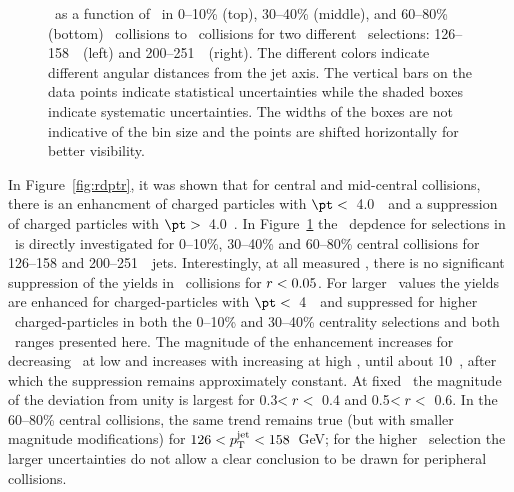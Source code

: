 \begin{figure}
   \caption{\RDptr\ as a function of \pt\ in  0--10\% (top), 30--40\% (middle), and 60--80\% (bottom) \PbPb\ collisions to \pp\ collisions for two different \ptjet\ selections: 126--158~\GeV\ (left) and 200--251~\GeV\ (right). The different colors indicate different angular distances from the jet axis. The vertical bars on the data points indicate statistical uncertainties while the shaded boxes indicate systematic uncertainties. The widths of the boxes are not indicative of the bin size and the points are shifted horizontally for better visibility.}
      \label{fig:pttrkdep}
\end{figure}


In Figure~\ref{fig:rdptr}, it was shown that for central and mid-central collisions, there is an enhancment of
charged particles with $\pt <$~4.0~\GeV\ and a suppression of charged particles with $\pt >$~4.0~\GeV.  In
Figure~\ref{fig:pttrkdep} 
the \pt\ depdence for selections in \rvar\ is directly investigated for 0--10\%, 30--40\% and 60--80\% central 
collisions for 126--158 and 200--251~\GeV\ jets.
Interestingly, at all measured \pt, there is no significant suppression of the yields in \pbpb\ collisions
for $\mbox{$r$} < 0.05$.  For larger \rvar\ values the yields are enhanced for charged-particles with $\pt <$~4~\GeV\ and 
suppressed for higher \pt\ charged-particles in both the 0--10\% and 30--40\% centrality selections and both \ptjet\ 
ranges presented here.  The magnitude of the enhancement increases for decreasing \pt\ at low \pt and increases
with increasing \pt at high \pt, until about 10~\GeV, after which the suppression remains approximately constant.
At fixed \pt\ the magnitude of the deviation from unity is largest for 0.3$< \mbox{$r$} <$~0.4 and 0.5$< \mbox{$r$} <$~0.6.
In the 60--80\% central collisions, the same trend remains true (but with smaller magnitude 
modifications) for \mbox{$126 < \mbox{$p_{\mathrm{T}}^{\mathrm{jet}}$} < 158$ GeV}; for the higher \ptjet\ selection the larger uncertainties 
do not allow a clear conclusion to be drawn for peripheral collisions.

